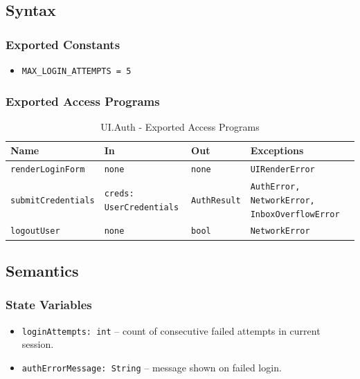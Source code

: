 \documentclass[12pt, titlepage]{article}
\begin{document}
\subsection{Syntax}

\subsubsection{Exported Constants}
\begin{itemize}
    \item \texttt{MAX\_LOGIN\_ATTEMPTS = 5}
\end{itemize}

\subsubsection{Exported Access Programs}

\begin{table}[H]
\centering
\small
\caption{UI.Auth - Exported Access Programs}
\begin{tabular}{p{3.5cm} p{3.2cm} p{3.2cm} p{4.1cm}}
\toprule
\textbf{Name} & \textbf{In} & \textbf{Out} & \textbf{Exceptions} \\
\midrule
\texttt{renderLoginForm} & \texttt{none} & \texttt{none} & \texttt{UIRenderError} \\
\texttt{submitCredentials} & \texttt{creds: UserCredentials} & \texttt{AuthResult} & \texttt{AuthError, NetworkError, InboxOverflowError} \\
\texttt{logoutUser} & \texttt{none} & \texttt{bool} & \texttt{NetworkError} \\
\bottomrule
\end{tabular}
\end{table}

\subsection{Semantics}

\subsubsection{State Variables}
\begin{itemize}
    \item \texttt{loginAttempts: int} – count of consecutive failed attempts in current session.
    \item \texttt{authErrorMessage: String} – message shown on failed login.
\end{itemize}
\end{document}

